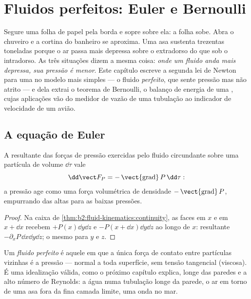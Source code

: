 \chapter{Fluidos perfeitos: Euler e Bernoulli}\label{ch:b2:euler-bernoulli}

Segure uma folha de papel pela borda e sopre sobre ela: a folha sobe.
Abra o chuveiro e a cortina do banheiro se aproxima. Uma asa sustenta
trezentas toneladas porque o ar passa mais depressa sobre o extradorso
do que sob o intradorso. As três situações dizem a mesma coisa:
\emph{onde um fluido anda mais depressa, sua pressão é menor}. Este
capítulo escreve a segunda lei de Newton para uma 
no modelo mais simples --- o fluido \emph{perfeito}, que sente pressão
mas não atrito --- e dela extrai o teorema de Bernoulli, o balanço de
energia de uma , cujas aplicações vão do medidor de
vazão de uma tubulação ao indicador de velocidade de um avião.

\section{A equação de Euler}

\begin{proposition}\label{prop:b2:euler-bernoulli:pressure}
A resultante das forças de pressão exercidas pelo fluido circundante
sobre uma partícula de volume $\dd\tau$ vale
\[
\dd\vect F_P = -\operatorname{\vect{grad}}P\,\dd\tau :
\]
a pressão age como uma força volumétrica de densidade $-\operatorname{\vect{grad}}P$,
empurrando das altas para as baixas pressões.
\end{proposition}

\begin{proof}
Na caixa de \cref{thm:b2:fluid-kinematics:continuity}, as faces em
$x$ e em $x + \dd x$ recebem $+P(x)\dd y\dd z$ e $-P(x + \dd x)\dd y\dd z$
ao longo de $x$: resultante $-\partial_xP\,\dd x\dd y\dd z$; o mesmo para $y$ e $z$.
\end{proof}

\begin{definition}\label{def:b2:euler-bernoulli:perfect}
Um \emph{fluido perfeito} é aquele em que a única força de contato entre
partículas vizinhas é a pressão --- normal a toda superfície, sem
tensão tangencial (viscosa). É uma idealização válida, como o próximo
capítulo explica, longe das paredes e a alto número de Reynolds: a água
numa tubulação longe da parede, o ar em torno de uma asa fora da fina
camada limite, uma onda no mar.
\end{definition}

